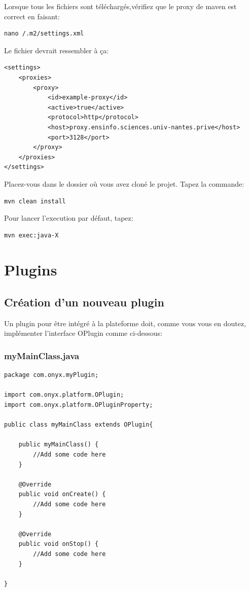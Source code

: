 Lorsque tous les fichiers sont téléchargés,vérifiez que le proxy de maven est correct en faisant:
\begin{verbatim}
nano /.m2/settings.xml
\end{verbatim}

Le fichier devrait ressembler à ça:
\begin{verbatim}
<settings>
    <proxies>
        <proxy>
            <id>example-proxy</id>
            <active>true</active>
            <protocol>http</protocol>
            <host>proxy.ensinfo.sciences.univ-nantes.prive</host>
            <port>3128</port>
        </proxy>
    </proxies>
</settings>
\end{verbatim}

Placez-vous dans le dossier où vous avez cloné le projet. 
Tapez la commande:
\begin{verbatim}
mvn clean install
\end{verbatim}

Pour lancer l'execution par défaut, tapez:
\begin{verbatim}
mvn exec:java-X
\end{verbatim}

\newpage
\section{Plugins}

\subsection{Création d'un nouveau plugin}

Un plugin pour être intégré à la plateforme doit, comme vous vous en doutez, implémenter l'interface OPlugin comme ci-dessous:
\subsubsection{myMainClass.java}
\begin{verbatim}
package com.onyx.myPlugin;

import com.onyx.platform.OPlugin;
import com.onyx.platform.OPluginProperty;

public class myMainClass extends OPlugin{

    public myMainClass() {
        //Add some code here
    }

    @Override
    public void onCreate() {
        //Add some code here
    }

    @Override
    public void onStop() {
        //Add some code here
    }

}
\end{verbatim}

